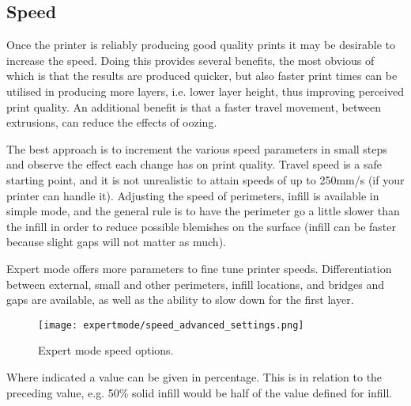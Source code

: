 
\subsection{Speed} %
\label{sec:speed}

Once the printer is reliably producing good quality prints it may be desirable to increase the speed.  Doing this provides several benefits, the most obvious of which is that the results are produced quicker, but also faster print times can be utilised in producing more layers, i.e. lower layer height, thus improving perceived print quality.  An additional benefit is that a faster travel movement, between extrusions, can reduce the effects of oozing.

The best approach is to increment the various speed parameters in small steps and observe the effect each change has on print quality.  Travel speed is a safe starting point, and it is not unrealistic to attain speeds of up to 250mm/s (if your printer can handle it).  Adjusting the speed of perimeters, infill is available in simple mode, and the general rule is to have the perimeter go a little slower than the infill in order to reduce possible blemishes on the surface (infill can be faster because slight gaps will not matter as much).

Expert mode offers more parameters to fine tune printer speeds.  Differentiation between external, small and other perimeters, infill locations, and bridges and gaps are available, as well as the ability to slow down for the first layer.

\begin{figure}[H]
\centering
\texttt{[image: expertmode/speed\_advanced\_settings.png]}
\caption{Expert mode speed options.}
\label{fig:speed_advanced_settings}
\end{figure}

Where indicated a value can be given in percentage.  This is in relation to the preceding value, e.g. 50\% solid infill would be half of the value defined for infill.

